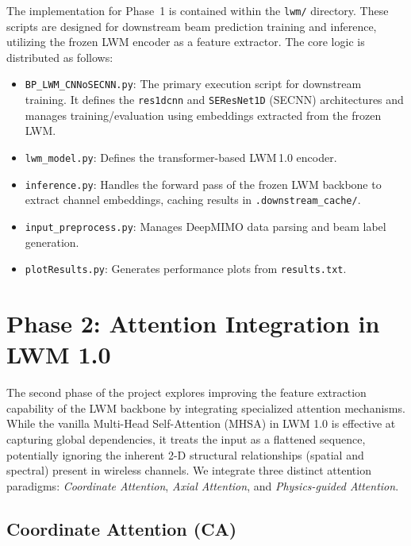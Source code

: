 \documentclass[12pt,a4paper]{article}
\begin{document}
The implementation for Phase~1 is contained within the \texttt{lwm/} directory. These scripts are designed for downstream beam prediction training and inference, utilizing the frozen LWM encoder as a feature extractor. The core logic is distributed as follows:

\begin{itemize}
    \item \texttt{BP\_LWM\_CNNoSECNN.py}: The primary execution script for downstream training. It defines the \texttt{res1dcnn} and \texttt{SEResNet1D} (SECNN) architectures and manages training/evaluation using embeddings extracted from the frozen LWM.
    \item \texttt{lwm\_model.py}: Defines the transformer-based LWM\,1.0 encoder.
    \item \texttt{inference.py}: Handles the forward pass of the frozen LWM backbone to extract channel embeddings, caching results in \texttt{.downstream\_cache/}.
    \item \texttt{input\_preprocess.py}: Manages DeepMIMO data parsing and beam label generation.
    \item \texttt{plotResults.py}: Generates performance plots from \texttt{results.txt}.
\end{itemize}

\newpage
\section{Phase 2: Attention Integration in LWM 1.0}\label{sec:phase2}

The second phase of the project explores improving the feature extraction capability of the LWM backbone by integrating specialized attention mechanisms. While the vanilla Multi-Head Self-Attention (MHSA) in LWM 1.0 is effective at capturing global dependencies, it treats the input as a flattened sequence, potentially ignoring the inherent 2-D structural relationships (spatial and spectral) present in wireless channels. We integrate three distinct attention paradigms: \emph{Coordinate Attention}, \emph{Axial Attention}, and \emph{Physics-guided Attention}.

\subsection{Coordinate Attention (CA)}\label{subsec:ca}
\end{document}
